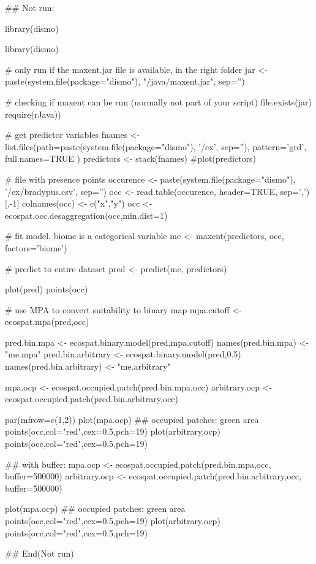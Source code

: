 \documentclass[a4paper]{book}
\begin{document}
\begin{Examples}
\begin{ExampleCode}

## Not run: 

library(dismo)


library(dismo)


# only run if the maxent.jar file is available, in the right folder
jar <- paste(system.file(package="dismo"), "/java/maxent.jar", sep='')

# checking if maxent can be run (normally not part of your script)
file.exists(jar)
require(rJava))

# get predictor variables
fnames <- list.files(path=paste(system.file(package="dismo"), '/ex', sep=''), 
                     pattern='grd', full.names=TRUE )
predictors <- stack(fnames)
#plot(predictors)

# file with presence points
occurence <- paste(system.file(package="dismo"), '/ex/bradypus.csv', sep='')
occ <- read.table(occurence, header=TRUE, sep=',')[,-1]
colnames(occ) <- c("x","y")
occ <- ecospat.occ.desaggregation(occ,min.dist=1)

# fit model, biome is a categorical variable
me <- maxent(predictors, occ, factors='biome')

# predict to entire dataset
pred <- predict(me, predictors) 

plot(pred)
points(occ)


# use MPA to convert suitability to binary map
mpa.cutoff <- ecospat.mpa(pred,occ)

pred.bin.mpa <- ecospat.binary.model(pred,mpa.cutoff)
names(pred.bin.mpa) <- "me.mpa"
pred.bin.arbitrary <- ecospat.binary.model(pred,0.5)
names(pred.bin.arbitrary) <- "me.arbitrary"


mpa.ocp  <- ecospat.occupied.patch(pred.bin.mpa,occ)
arbitrary.ocp  <- ecospat.occupied.patch(pred.bin.arbitrary,occ)

par(mfrow=c(1,2))
plot(mpa.ocp) ## occupied patches: green area
points(occ,col="red",cex=0.5,pch=19)
plot(arbitrary.ocp)
points(occ,col="red",cex=0.5,pch=19)

## with buffer:
mpa.ocp  <- ecospat.occupied.patch(pred.bin.mpa,occ, buffer=500000)
arbitrary.ocp  <- ecospat.occupied.patch(pred.bin.arbitrary,occ, buffer=500000)

plot(mpa.ocp) ## occupied patches: green area
points(occ,col="red",cex=0.5,pch=19)
plot(arbitrary.ocp)
points(occ,col="red",cex=0.5,pch=19)

## End(Not run)

\end{ExampleCode}
\end{Examples}
\end{document}
